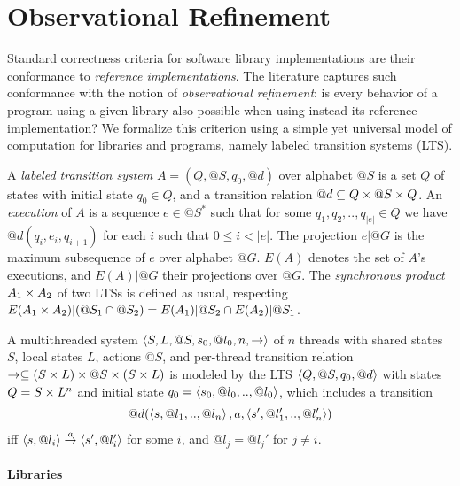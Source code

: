 \section{Observational Refinement}\label{sec:obsref}

\newcommand{\match}{\bowtie}

Standard correctness criteria for software library implementations are their
conformance to \emph{reference implementations}. The literature captures such
conformance with the notion of \emph{observational refinement}: is every
behavior of a program using a given library also possible when using instead
its reference implementation? We formalize this criterion using a simple yet
universal model of computation for libraries and programs, namely labeled
transition systems (LTS).

A \emph{labeled transition system} $A = (Q,@S,q_0,@d)$ over alphabet $@S$ is a
set $Q$ of states with initial state $q_0 \in Q$, and a transition relation $@d
\subseteq Q \times @S \times Q$. An \emph{execution} of $A$ is a sequence $e \in @S^*$ such
that for some $q_1, q_2, .., q_{|e|} \in Q$ we have $@d(q_i,e_i,q_{i+1})$ for
each $i$ such that $0 \le i < |e|$. The projection $e|@G$ is the maximum subsequence of $e$
over alphabet $@G$. $E(A)$ denotes the set of $A$'s executions, and $E(A)|@G$
their projections over $@G$. The \emph{synchronous product} $A_1 \times A_2$ of two
LTSs is defined as usual, respecting $E(A_1 \times A_2)|(@S_1 \cap @S_2) =
E(A_1)|@S_2 \cap E(A_2)|@S_1$.

\begin{example}
  \label{ex:threads:1}

  A multithreaded system $\left\langle {S,L,@S,s_0,@l_0,n,->} \right\rangle$ of $n$ threads with
  shared states $S$, local states $L$, actions $@S$, and per-thread transition
  relation $-> \subseteq (S \times L) \times @S \times (S \times L)$ is modeled by the LTS
  $\left\langle {Q,@S,q_0,@d} \right\rangle$ with states $Q = S \times L^n$ and initial state $q_0 =
  \left\langle {s_0, @l_0, .., @l_0} \right\rangle$, which includes a transition
  \begin{align*}
    @d(\left\langle {s, @l_1, .., @l_n} \right\rangle, a, \left\langle {s', @l_1', .., @l_n'} \right\rangle)
  \end{align*}
  iff $\left\langle {s,@l_i} \right\rangle \overset{a}{\rightarrow} \left\langle {s',@l_i'} \right\rangle$ for some $i$, and
  $@l_j = @l_j'$ for $j \neq i$.
  

\end{example}

\paragraph{Libraries}

